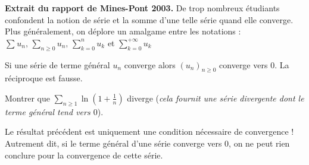 \documentclass[french,11pt,twoside]{VcCours}
\newcommand{\Sum}[2]{\ensuremath{\textstyle{\sum\limits_{#1}^{#2}}}}
\begin{document}
\textbf{Extrait du rapport de Mines-Pont 2003.} \og De trop nombreux étudiants confondent la notion de série et la somme d'une telle série quand elle converge.  Plus généralement, on déplore un amalgame entre les notations : $\Sum{}{} u_n, \,  \Sum{n \geq 0}{} u_n,  \, \Sum{k = 0}{n} u_k$ et $\Sum{k =0}{+ \infty} u_k$ \fg 

\medskip


\begin{thm} Si une série de terme général $u_n$ converge alors $(u_n)_{n \geq 0}$ converge vers $0$. La réciproque est fausse. \end{thm}

\begin{preuve} 

\vspace{4cm}
%
%
\end{preuve}

\begin{exa} Montrer que $\Sum{n\geq 1}{} \ln \left(1 + \frac{1}{n} \right)$ diverge (\textit{cela fournit une série divergente dont le terme général tend vers $0$}).
\end{exa}


\begin{att} Le résultat précédent est uniquement une condition nécessaire de convergence ! Autrement dit, si le terme général d'une série converge vers $0$, on ne peut rien conclure pour la convergence de cette série. 
\end{att}
\end{document}
